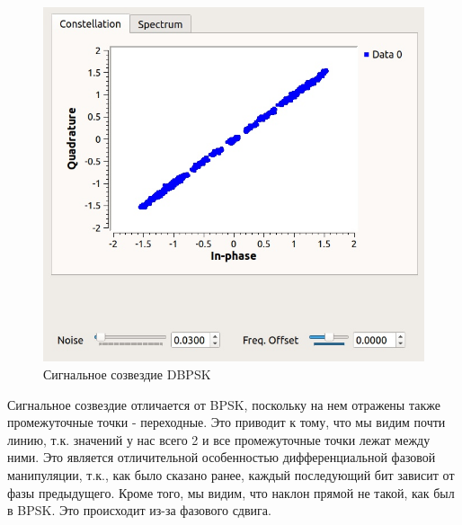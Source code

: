 	\begin{figure}[H]
		\begin{center}
			\includegraphics[scale=0.4]{../dbpsk.jpg}
			\caption{Сигнальное созвездие DBPSK} 
		\end{center}
	\end{figure}
	Сигнальное созвездие отличается от BPSK, поскольку на нем отражены также промежуточные точки - переходные. Это приводит к тому, что мы видим почти линию, т.к. значений у нас всего 2 и все промежуточные точки лежат между ними. Это является отличительной особенностью дифференциальной фазовой манипуляции, т.к., как было сказано ранее, каждый последующий бит зависит от фазы предыдущего. Кроме того, мы видим, что наклон прямой не такой, как был в BPSK. Это происходит из-за фазового сдвига.


